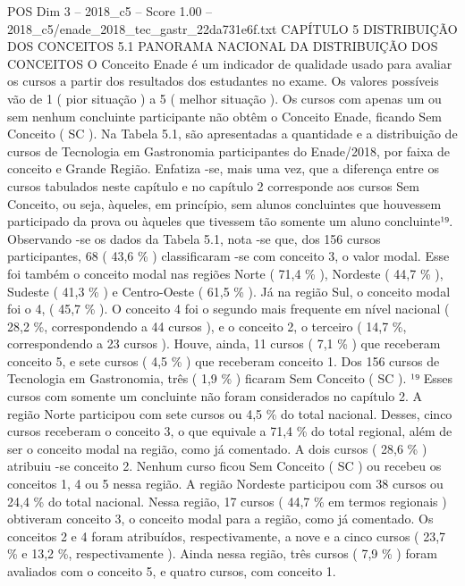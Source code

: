 \begin{textsample}{POS Dim 3 – 2018\_c5 – Score 1.00 – 2018\_c5/enade\_2018\_tec\_gastr\_22da731e6f.txt}  \label{ex:f3_pos_188}
CAPÍTULO 5 DISTRIBUIÇÃO DOS CONCEITOS 5.1 PANORAMA NACIONAL DA DISTRIBUIÇÃO DOS CONCEITOS O Conceito Enade é um indicador de qualidade usado para avaliar os cursos a partir dos resultados dos estudantes no exame.
Os valores possíveis vão de 1 ( pior situação ) a 5 ( melhor situação ).
Os cursos com apenas um ou sem nenhum concluinte participante não obtêm o Conceito Enade, ficando Sem Conceito ( SC ).
Na Tabela 5.1, são apresentadas a quantidade e a distribuição de cursos de Tecnologia em Gastronomia participantes do Enade/2018, por faixa de conceito e Grande Região.
Enfatiza -se, mais uma vez, que a diferença entre os cursos tabulados neste capítulo e no capítulo 2 corresponde aos cursos Sem Conceito, ou seja, àqueles, em princípio, sem alunos concluintes que houvessem participado da prova ou àqueles que tivessem tão somente um aluno concluinte¹⁹.
Observando -se os dados da Tabela 5.1, nota -se que, dos 156 cursos participantes, 68 ( 43,6 \% ) classificaram -se com conceito 3, o valor modal.
Esse foi também o conceito modal nas regiões Norte ( 71,4 \% ), Nordeste ( 44,7 \% ), Sudeste ( 41,3 \% ) e Centro-Oeste ( 61,5 \% ).
Já na região Sul, o conceito modal foi o 4, ( 45,7 \% ).
O conceito 4 foi o segundo mais frequente em nível nacional ( 28,2 \%, correspondendo a 44 cursos ), e o conceito 2, o terceiro ( 14,7 \%, correspondendo a 23 cursos ).
Houve, ainda, 11 cursos ( 7,1 \% ) que receberam conceito 5, e sete cursos ( 4,5 \% ) que receberam conceito 1.
Dos 156 cursos de Tecnologia em Gastronomia, três ( 1,9 \% ) ficaram Sem Conceito ( SC ). ¹⁹ Esses cursos com somente um concluinte não foram considerados no capítulo 2.
A região Norte participou com sete cursos ou 4,5 \% do total nacional.
Desses, cinco cursos receberam o conceito 3, o que equivale a 71,4 \% do total regional, além de ser o conceito modal na região, como já comentado.
A dois cursos ( 28,6 \% ) atribuiu -se conceito 2.
Nenhum curso ficou Sem Conceito ( SC ) ou recebeu os conceitos 1, 4 ou 5 nessa região.
A região Nordeste participou com 38 cursos ou 24,4 \% do total nacional.
Nessa região, 17 cursos ( 44,7 \% em termos regionais ) obtiveram conceito 3, o conceito modal para a região, como já comentado.
Os conceitos 2 e 4 foram atribuídos, respectivamente, a nove e a cinco cursos ( 23,7 \% e 13,2 \%, respectivamente ).
Ainda nessa região, três cursos ( 7,9 \% ) foram avaliados com o conceito 5, e quatro cursos, com conceito 1.

\end{textsample}
